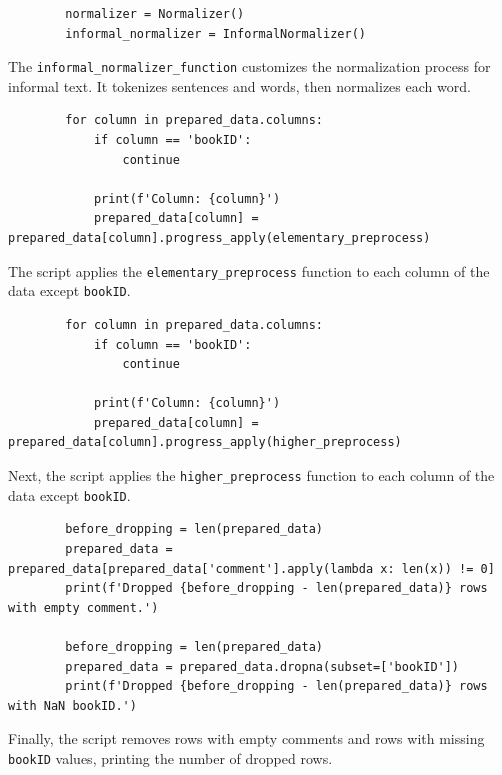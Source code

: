 \documentclass{solutionclass} %
\begin{document}
\begin{solution}
\begin{lstlisting}
        normalizer = Normalizer()
        informal_normalizer = InformalNormalizer()
        \end{lstlisting}
        
        The \texttt{informal\_normalizer\_function} customizes the normalization process for informal text. It tokenizes sentences and words, then normalizes each word.
        
        \begin{lstlisting}
        for column in prepared_data.columns:
            if column == 'bookID':
                continue
            
            print(f'Column: {column}')
            prepared_data[column] = prepared_data[column].progress_apply(elementary_preprocess)
        \end{lstlisting}
        
        The script applies the \texttt{elementary\_preprocess} function to each column of the data except \texttt{bookID}.
        
        \begin{lstlisting}
        for column in prepared_data.columns:
            if column == 'bookID':
                continue
            
            print(f'Column: {column}')
            prepared_data[column] = prepared_data[column].progress_apply(higher_preprocess)
        \end{lstlisting}
        
        Next, the script applies the \texttt{higher\_preprocess} function to each column of the data except \texttt{bookID}.
        
        \begin{lstlisting}
        before_dropping = len(prepared_data)
        prepared_data = prepared_data[prepared_data['comment'].apply(lambda x: len(x)) != 0]
        print(f'Dropped {before_dropping - len(prepared_data)} rows with empty comment.')
        
        before_dropping = len(prepared_data)
        prepared_data = prepared_data.dropna(subset=['bookID'])
        print(f'Dropped {before_dropping - len(prepared_data)} rows with NaN bookID.')
        \end{lstlisting}
        
        Finally, the script removes rows with empty comments and rows with missing \texttt{bookID} values, printing the number of dropped rows.
        
\end{solution}
\end{document}
